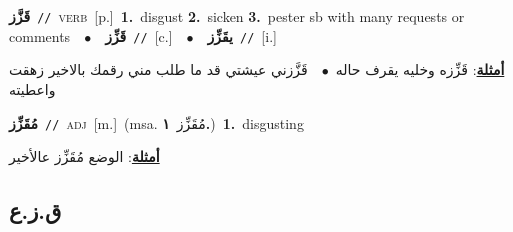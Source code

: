 \documentclass[10pt,a4paper,twoside]{article} %
\begin{document}
\begin{multicols}{2}
{\setlength\topsep{0pt}\textbf{\foreignlanguage{arabic}{قَزَّز}}\ {\color{gray}\texttt{//}\color{black}}\ \textsc{verb}\ [p.]\ \textbf{1.}~disgust  \textbf{2.}~sicken  \textbf{3.}~pester sb with many requests or comments\ \ $\bullet$\ \ \setlength\topsep{0pt}\textbf{\foreignlanguage{arabic}{قَزِّز}}\ {\color{gray}\texttt{//}\color{black}}\ [c.]\ \ $\bullet$\ \ \setlength\topsep{0pt}\textbf{\foreignlanguage{arabic}{يقَزِّز}}\ {\color{gray}\texttt{//}\color{black}}\ [i.]\  \begin{flushright}\color{gray}\foreignlanguage{arabic}{\textbf{\underline{\foreignlanguage{arabic}{أمثلة}}}: قَزِّزه وخليه يقرف حاله\ $\bullet$\ \  قَزَّزني عيشتي قد ما طلب مني رقمك بالاخير زهقت واعطيته}\end{flushright}\color{black}} \vspace{2mm}

{\setlength\topsep{0pt}\textbf{\foreignlanguage{arabic}{مُقَزِّز}}\ {\color{gray}\texttt{//}\color{black}}\ \textsc{adj}\ [m.]\ \color{gray}(msa. \foreignlanguage{arabic}{مُقَزِّز}~\foreignlanguage{arabic}{\textbf{١.}})\color{black}\ \textbf{1.}~disgusting\  \begin{flushright}\color{gray}\foreignlanguage{arabic}{\textbf{\underline{\foreignlanguage{arabic}{أمثلة}}}: الوضع مُقَزِّز عالأخير}\end{flushright}\color{black}} \vspace{2mm}

\vspace{-3mm}
\subsection*{\color{blue}\foreignlanguage{arabic}{ق.ز.ع}\color{blue}{}} 


\end{multicols}
\end{document}
